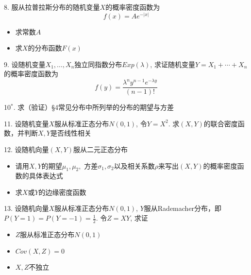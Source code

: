 \documentclass[10pt]{beamer}
\begin{document}
\begin{frame}

8. 服从拉普拉斯分布的随机变量$X$的概率密度函数为
$$f(x) = Ae^{-|x|}$$
\begin{itemize}
\item[(1)] 求常数$A$
\vspace{0.4em}
\item[(2)] 求$X$的分布函数$F(x)$
\end{itemize}

\vspace{1em}

9. 设随机变量$X_1,\ldots,X_n$独立同指数分布$Exp(\lambda)$, 求证随机变量$Y = X_1 + \cdots + X_n$的概率密度函数为
$$f(y) = \dfrac{\lambda^n y^{n-1} e^{-\lambda y}}{(n-1)!}$$

10$^*$. 求（验证）\S 4常见分布中所列举的分布的期望与方差

\end{frame}


\begin{frame}

11. 设随机变量$X$服从标准正态分布$N(0,1)$, 令$Y=X^2$. 求$(X,Y)$的联合密度函数，并判断$X,Y$是否线性相关

\vspace{1em}

12. 设随机向量$(X,Y)$服从二元正态分布
\begin{itemize}
\item[(1)] 请用$X,Y$的期望$\mu_1,\mu_2,$ 方差$\sigma_1,\sigma_2$以及相关系数$\rho$来写出$(X,Y)$的概率密度函数的具体表达式
\vspace{0.4em}
\item[(2)] 求$X$或$Y$的边缘密度函数
\end{itemize}

\vspace{1em}

13. 设随机向量$X$服从标准正态分布$N(0,1)$, $Y$服从Rademacher分布，即$P(Y = 1) = P(Y = -1) = \frac{1}{2}$. 令$Z = XY$, 求证
\begin{itemize}
\item[(1)] $Z$服从标准正态分布$N(0,1)$
\vspace{0.4em}
\item[(2)] $Cov(X,Z) = 0$
\vspace{0.4em}
\item[(2)] $X,Z$不独立
\end{itemize}

\end{frame}
\end{document}
